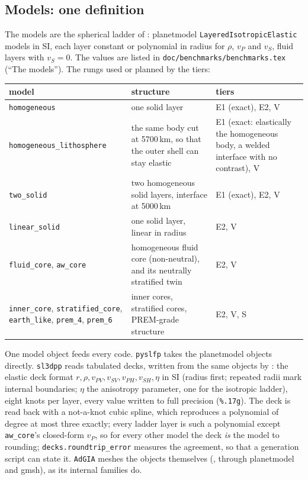 \documentclass[11pt]{article}
\numberwithin{equation}{section}
\newcommand{\code}[1]{\texttt{#1}}
\begin{document}
\subsection{Models: one definition}
\label{sec:models}

The models are the spherical ladder of :
planetmodel \code{LayeredIsotropicElastic} models in SI, each layer
constant or polynomial in radius for $\rho$, $v_P$ and $v_S$, fluid layers
with $v_S=0$. The values are listed in \code{doc/benchmarks/benchmarks.tex} (``The
models''). The rungs used or planned by the tiers:
\begin{center}
\small
\begin{tabular}{@{}P{4.2cm}P{5.4cm}P{5.4cm}@{}}
\toprule
model & structure & tiers \\
\midrule
\code{homogeneous} & one solid layer & E1 (exact), E2, V \\
\code{homogeneous\_lithosphere} & the same body cut at 5700\,km, so that
the outer shell can stay elastic & E1 (exact: elastically the homogeneous
body, a welded interface with no contrast), V \\
\code{two\_solid} & two homogeneous solid layers, interface at 5000\,km &
E1 (exact), E2, V \\
\code{linear\_solid} & one solid layer, linear in radius & E2, V \\
\code{fluid\_core}, \code{aw\_core} & homogeneous fluid core (non-neutral),
and its neutrally stratified twin & E2, V \\
\code{inner\_core}, \code{stratified\_core}, \code{earth\_like},
\code{prem\_4}, \code{prem\_6} & inner cores, stratified cores, PREM-grade
structure & E2, V, S \\
\bottomrule
\end{tabular}
\end{center}

One model object feeds every code. \code{pyslfp} takes the planetmodel
objects directly. \code{sl3dpp} reads tabulated decks, written from the same
objects by : the elastic deck format
$r,\rho,v_{PV},v_{SV},v_{PH},v_{SH},\eta$ in SI (radius first; repeated
radii mark internal boundaries; $\eta$ the anisotropy parameter, one for
the isotropic ladder), eight knots per layer, every value written to full
precision (\code{\%.17g}). The deck is read back with a not-a-knot cubic
spline, which reproduces a polynomial of degree at most three exactly; every
ladder layer is such a polynomial except \code{aw\_core}'s closed-form
$v_P$, so for every other model the deck \emph{is} the model to rounding;
\code{decks.roundtrip\_error} measures the agreement, so that a generation
script can state it. \code{AdGIA} meshes the objects themselves
(, through planetmodel and gmsh), as
its internal families do.
\end{document}
